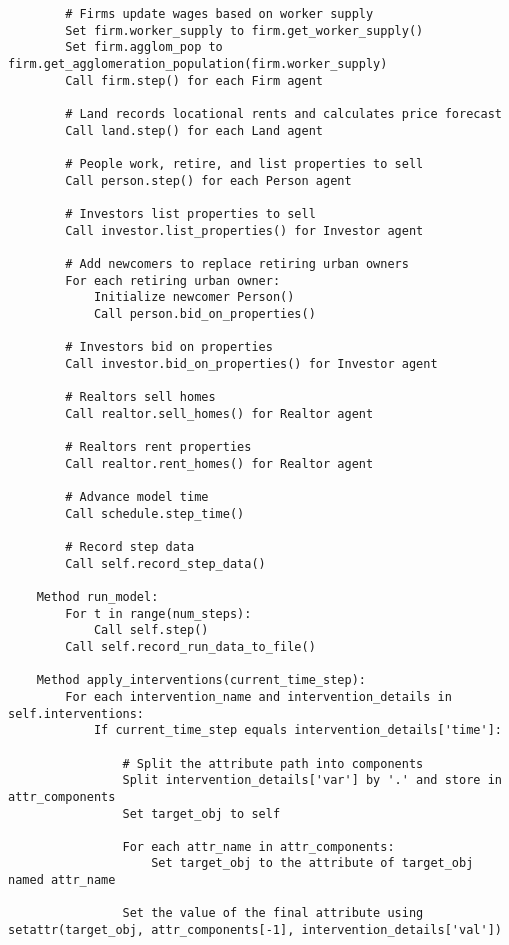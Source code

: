 {\begin{verbatim}
        # Firms update wages based on worker supply
        Set firm.worker_supply to firm.get_worker_supply()
        Set firm.agglom_pop to firm.get_agglomeration_population(firm.worker_supply)
        Call firm.step() for each Firm agent

        # Land records locational rents and calculates price forecast
        Call land.step() for each Land agent

        # People work, retire, and list properties to sell
        Call person.step() for each Person agent

        # Investors list properties to sell
        Call investor.list_properties() for Investor agent

        # Add newcomers to replace retiring urban owners
        For each retiring urban owner:
            Initialize newcomer Person()
            Call person.bid_on_properties()

        # Investors bid on properties
        Call investor.bid_on_properties() for Investor agent

        # Realtors sell homes
        Call realtor.sell_homes() for Realtor agent

        # Realtors rent properties
        Call realtor.rent_homes() for Realtor agent

        # Advance model time
        Call schedule.step_time()

        # Record step data
        Call self.record_step_data()

    Method run_model:
        For t in range(num_steps):
            Call self.step()
        Call self.record_run_data_to_file()

    Method apply_interventions(current_time_step):
        For each intervention_name and intervention_details in self.interventions:
            If current_time_step equals intervention_details['time']:
                
                # Split the attribute path into components
                Split intervention_details['var'] by '.' and store in attr_components
                Set target_obj to self
                
                For each attr_name in attr_components:
                    Set target_obj to the attribute of target_obj named attr_name

                Set the value of the final attribute using setattr(target_obj, attr_components[-1], intervention_details['val'])
    
\end{verbatim} }

